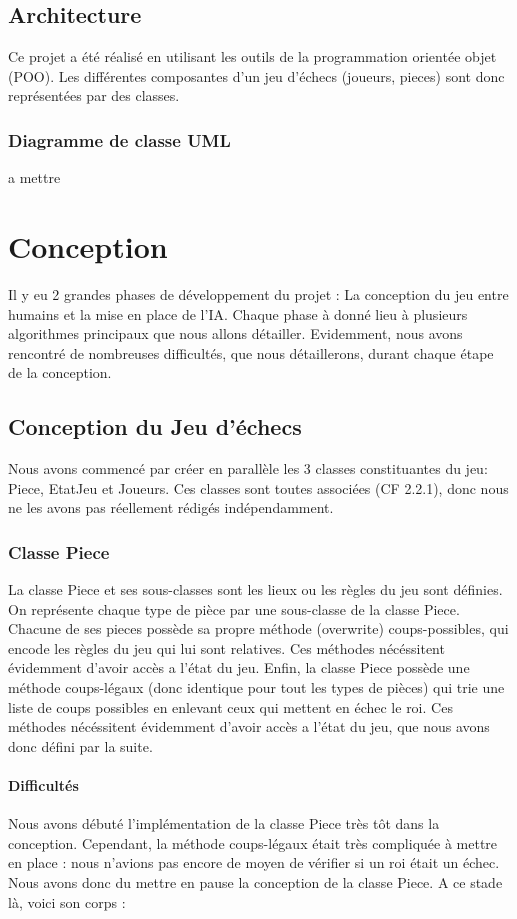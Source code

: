 \documentclass{article}
\begin{document}
\subsection{Architecture}
Ce projet a été réalisé en utilisant les outils de la programmation orientée objet (POO).
Les différentes composantes d'un jeu d'échecs (joueurs, pieces) sont donc 
représentées par des classes.
\subsubsection{Diagramme de classe UML}
a mettre

\section{Conception}
Il y eu 2 grandes phases de développement du projet : La conception du jeu entre humains
et la mise en place de l'IA. Chaque phase à donné lieu à plusieurs algorithmes principaux que nous allons détailler.
Evidemment, nous avons rencontré de nombreuses difficultés, que nous détaillerons, durant chaque étape de la conception.

\subsection{Conception du Jeu d'échecs}
Nous avons commencé par créer en parallèle les 3 classes constituantes du jeu:
Piece, EtatJeu et Joueurs. Ces classes sont toutes associées (CF 2.2.1), donc
nous ne les avons pas réellement rédigés indépendamment.
\subsubsection{Classe Piece}
La classe Piece et ses sous-classes sont les lieux ou les règles du jeu sont définies.
On représente chaque type de pièce par une sous-classe de la classe Piece.
Chacune de ses pieces possède sa propre méthode (overwrite) coups-possibles, qui encode les règles du jeu
qui lui sont relatives. Ces méthodes nécéssitent évidemment d'avoir accès a l'état du jeu.
Enfin, la classe Piece possède une méthode coups-légaux (donc identique pour tout les types de pièces)
qui trie une liste de coups possibles en enlevant ceux qui mettent en échec le roi.
Ces méthodes nécéssitent évidemment d'avoir accès a l'état du jeu, que nous avons donc défini par la suite.
\paragraph{Difficultés}
Nous avons débuté  l'implémentation de la classe Piece très tôt dans la conception. Cependant, la méthode 
coups-légaux était très compliquée à mettre en place : nous n'avions pas encore
de moyen de vérifier si un roi était un échec. Nous avons donc du mettre en pause
la conception de la classe Piece. A ce stade là, voici son corps : 
\end{document}
